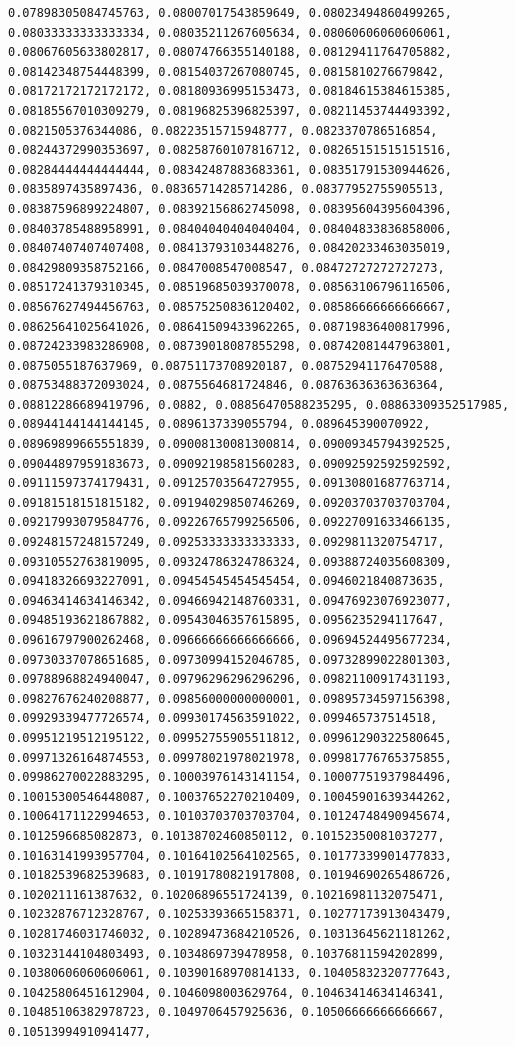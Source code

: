 \documentclass[11pt]{article}
\begin{document}
\begin{Verbatim}[commandchars=\\\{\}]
0.07898305084745763, 0.08007017543859649, 0.08023494860499265, 0.08033333333333334, 0.08035211267605634, 0.08060606060606061, 0.08067605633802817, 0.08074766355140188, 0.08129411764705882, 0.08142348754448399, 0.08154037267080745, 0.0815810276679842, 0.08172172172172172, 0.08180936995153473, 0.08184615384615385, 0.08185567010309279, 0.08196825396825397, 0.08211453744493392, 0.0821505376344086, 0.08223515715948777, 0.0823370786516854, 0.08244372990353697, 0.08258760107816712, 0.08265151515151516, 0.08284444444444444, 0.08342487883683361, 0.08351791530944626, 0.0835897435897436, 0.08365714285714286, 0.08377952755905513, 0.08387596899224807, 0.08392156862745098, 0.08395604395604396, 0.08403785488958991, 0.08404040404040404, 0.08404833836858006, 0.08407407407407408, 0.08413793103448276, 0.08420233463035019, 0.08429809358752166, 0.0847008547008547, 0.08472727272727273, 0.08517241379310345, 0.08519685039370078, 0.08563106796116506, 0.08567627494456763, 0.08575250836120402, 0.08586666666666667, 0.08625641025641026, 0.08641509433962265, 0.08719836400817996, 0.08724233983286908, 0.08739018087855298, 0.08742081447963801, 0.0875055187637969, 0.08751173708920187, 0.08752941176470588, 0.08753488372093024, 0.0875564681724846, 0.08763636363636364, 0.08812286689419796, 0.0882, 0.08856470588235295, 0.08863309352517985, 0.08944144144144145, 0.0896137339055794, 0.089645390070922, 0.08969899665551839, 0.09008130081300814, 0.09009345794392525, 0.09044897959183673, 0.09092198581560283, 0.09092592592592592, 0.09111597374179431, 0.09125703564727955, 0.09130801687763714, 0.09181518151815182, 0.09194029850746269, 0.09203703703703704, 0.09217993079584776, 0.09226765799256506, 0.09227091633466135, 0.09248157248157249, 0.09253333333333333, 0.0929811320754717, 0.09310552763819095, 0.09324786324786324, 0.09388724035608309, 0.09418326693227091, 0.09454545454545454, 0.0946021840873635, 0.09463414634146342, 0.09466942148760331, 0.09476923076923077, 0.09485193621867882, 0.09543046357615895, 0.0956235294117647, 0.09616797900262468, 0.09666666666666666, 0.09694524495677234, 0.09730337078651685, 0.09730994152046785, 0.09732899022801303, 0.09788968824940047, 0.09796296296296296, 0.09821100917431193, 0.09827676240208877, 0.09856000000000001, 0.09895734597156398, 0.09929339477726574, 0.09930174563591022, 0.099465737514518, 0.09951219512195122, 0.09952755905511812, 0.09961290322580645, 0.09971326164874553, 0.09978021978021978, 0.09981776765375855, 0.09986270022883295, 0.10003976143141154, 0.10007751937984496, 0.10015300546448087, 0.10037652270210409, 0.10045901639344262, 0.10064171122994653, 0.10103703703703704, 0.10124748490945674, 0.1012596685082873, 0.10138702460850112, 0.10152350081037277, 0.10163141993957704, 0.10164102564102565, 0.10177339901477833, 0.10182539682539683, 0.10191780821917808, 0.10194690265486726, 0.1020211161387632, 0.10206896551724139, 0.10216981132075471, 0.10232876712328767, 0.10253393665158371, 0.10277173913043479, 0.10281746031746032, 0.10289473684210526, 0.10313645621181262, 0.10323144104803493, 0.1034869739478958, 0.10376811594202899, 0.10380606060606061, 0.10390168970814133, 0.10405832320777643, 0.10425806451612904, 0.1046098003629764, 0.10463414634146341, 0.10485106382978723, 0.1049706457925636, 0.10506666666666667, 0.10513994910941477, 
\end{Verbatim}
\end{document}
